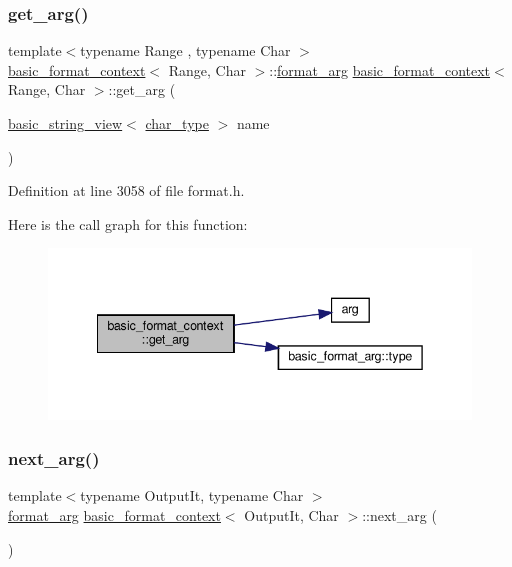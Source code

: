 \subsubsection{\texorpdfstring{get\+\_\+arg()}{get\_arg()}\hspace{0.1cm}{\footnotesize\ttfamily [2/2]}}
{\footnotesize\ttfamily template$<$typename Range , typename Char $>$ \\
\hyperlink{classbasic__format__context}{basic\+\_\+format\+\_\+context}$<$ Range, Char $>$\+::\hyperlink{classbasic__format__arg}{format\+\_\+arg} \hyperlink{classbasic__format__context}{basic\+\_\+format\+\_\+context}$<$ Range, Char $>$\+::get\+\_\+arg (\begin{DoxyParamCaption}\item[{\hyperlink{classbasic__string__view}{basic\+\_\+string\+\_\+view}$<$ \hyperlink{classbasic__format__context_ab6b3447e996c0b8117e4f6d98d4e1597}{char\+\_\+type} $>$}]{name }\end{DoxyParamCaption})}



Definition at line 3058 of file format.\+h.

Here is the call graph for this function\+:
\nopagebreak
\begin{figure}[H]
\begin{center}
\leavevmode
\includegraphics[width=342pt]{classbasic__format__context_a251d1e5b73671a838b7937bac2dc6aff_cgraph}
\end{center}
\end{figure}
\mbox{\label{classbasic__format__context_a38f34ffad997ca2d16cefc33ab240f89}} 
\subsubsection{\texorpdfstring{next\+\_\+arg()}{next\_arg()}}
{\footnotesize\ttfamily template$<$typename Output\+It, typename Char $>$ \\
\hyperlink{classbasic__format__arg}{format\+\_\+arg} \hyperlink{classbasic__format__context}{basic\+\_\+format\+\_\+context}$<$ Output\+It, Char $>$\+::next\+\_\+arg (\begin{DoxyParamCaption}{ }\end{DoxyParamCaption})\hspace{0.3cm}{\ttfamily [inline]}}



